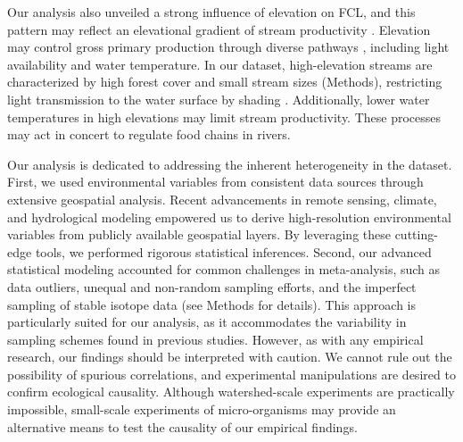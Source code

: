 \documentclass[11pt, class=article, crop=false]{standalone}
\begin{document}
Our analysis also unveiled a strong influence of elevation on FCL, and this pattern may reflect an elevational gradient of stream productivity \citep{marzolf_ecosystem_2021}.
Elevation may control gross primary production through diverse pathways \citep{marzolf_ecosystem_2021, atkinson_determinants_2018}, including light availability and water temperature.
In our dataset, high-elevation streams are characterized by high forest cover and small stream sizes (Methods), restricting light transmission to the water surface by shading \citep{finlay_light-mediated_2011, finlay_human_2013, bernhardt_light_2022}.
Additionally, lower water temperatures in high elevations may limit stream productivity.
These processes may act in concert to regulate food chains in rivers.

Our analysis is dedicated to addressing the inherent heterogeneity in the dataset.
First, we used environmental variables from consistent data sources through extensive geospatial analysis.
Recent advancements in remote sensing, climate, and hydrological modeling empowered us to derive high-resolution environmental variables from publicly available geospatial layers.
By leveraging these cutting-edge tools, we performed rigorous statistical inferences. 
Second, our advanced statistical modeling accounted for common challenges in meta-analysis, such as data outliers, unequal and non-random sampling efforts, and the imperfect sampling of stable isotope data (see Methods for details).
This approach is particularly suited for our analysis, as it accommodates the variability in sampling schemes found in previous studies.
However, as with any empirical research, our findings should be interpreted with caution.
We cannot rule out the possibility of spurious correlations, and experimental manipulations are desired to confirm ecological causality.
Although watershed-scale experiments are practically impossible, small-scale experiments of micro-organisms may provide an alternative means to test the causality of our empirical findings.
\end{document}
